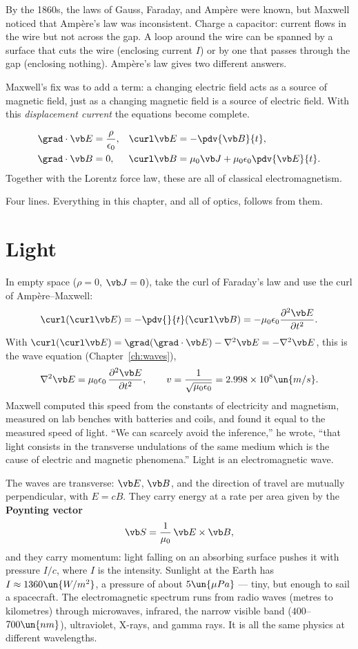 By the 1860s, the laws of Gauss, Faraday, and Amp\`ere were known, but Maxwell noticed that Amp\`ere's law was inconsistent. Charge a capacitor: current flows in the wire but not across the gap. A loop around the wire can be spanned by a surface that cuts the wire (enclosing current $I$) or by one that passes through the gap (enclosing nothing). Amp\`ere's law gives two different answers.

Maxwell's fix was to add a term: a changing electric field acts as a source of magnetic field, just as a changing magnetic field is a source of electric field. With this \emph{displacement current} the equations become complete.

\begin{law}
\begin{align*}
  \grad\cdot\vb E &= \frac{\rho}{\epsilon_0}, &
  \curl\vb E &= -\pdv{\vb B}{t},\\
  \grad\cdot\vb B &= 0, &
  \curl\vb B &= \mu_0\vb J + \mu_0\epsilon_0\pdv{\vb E}{t}.
\end{align*}
Together with the Lorentz force law, these are all of classical electromagnetism.
\end{law}

Four lines. Everything in this chapter, and all of optics, follows from them.

\section{Light}

In empty space ($\rho = 0$, $\vb J=0$), take the curl of Faraday's law and use the curl of Amp\`ere--Maxwell:
\[
  \curl(\curl\vb E) = -\pdv{}{t}(\curl\vb B) = -\mu_0\epsilon_0\frac{\partial^2\vb E}{\partial t^2}.
\]
With $\curl(\curl\vb E) = \grad(\grad\cdot\vb E) - \nabla^2\vb E = -\nabla^2\vb E$, this is the wave equation (Chapter~\ref{ch:waves}),
\[
  \nabla^2\vb E = \mu_0\epsilon_0\,\frac{\partial^2\vb E}{\partial t^2},
  \qquad
  v = \frac{1}{\sqrt{\mu_0\epsilon_0}} = 2.998\times10^{8}\un{m/s}.
\]
Maxwell computed this speed from the constants of electricity and magnetism, measured on lab benches with batteries and coils, and found it equal to the measured speed of light. ``We can scarcely avoid the inference,'' he wrote, ``that light consists in the transverse undulations of the same medium which is the cause of electric and magnetic phenomena.'' Light is an electromagnetic wave.

The waves are transverse: $\vb E$, $\vb B$, and the direction of travel are mutually perpendicular, with $E = cB$. They carry energy at a rate per area given by the \textbf{Poynting vector}
\[
  \vb S = \frac{1}{\mu_0}\,\vb E\times\vb B,
\]
and they carry momentum: light falling on an absorbing surface pushes it with pressure $I/c$, where $I$ is the intensity. Sunlight at the Earth has $I\approx1360\un{W/m^2}$, a pressure of about $5\un{\mu Pa}$ --- tiny, but enough to sail a spacecraft. The electromagnetic spectrum runs from radio waves (metres to kilometres) through microwaves, infrared, the narrow visible band ($400$--$700\un{nm}$), ultraviolet, X-rays, and gamma rays. It is all the same physics at different wavelengths.

